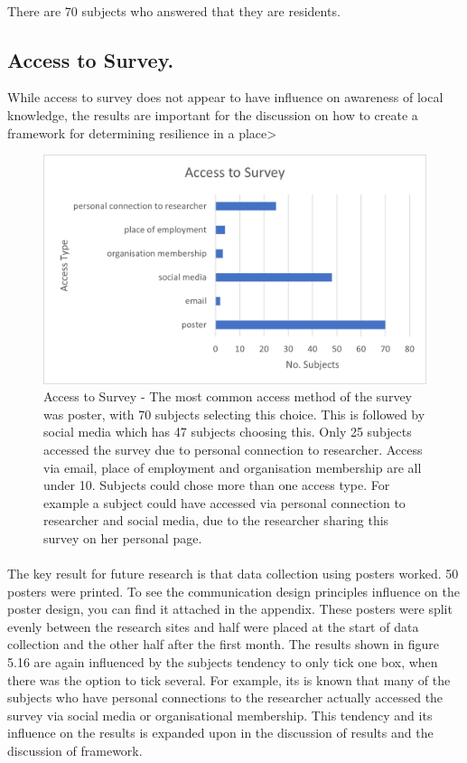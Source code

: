 \paragraph{}

There are 70 subjects who answered that they are residents.


\subsection{Access to Survey. }
While access to survey does not appear to have influence on awareness of local knowledge, the results are important for the discussion on how to create a framework for determining resilience in a place>

\begin{figure}[h!]
    \centering
    \includegraphics{fig_results/access_survey.png}
    \caption{Access to Survey - The most common access method of the survey was poster, with 70 subjects selecting this choice. This is followed by social media which has 47 subjects choosing this. Only 25 subjects accessed the survey due to personal connection to researcher. Access via email, place of employment and organisation membership are all under 10. Subjects could chose more than one access type. For example a subject could have accessed via personal connection to researcher and social media, due to the researcher sharing this survey on her personal page. }
    \label{fig:my_label}
\end{figure}
\paragraph{}

The key result for future research is that data collection using posters worked. 50 posters were printed. To see the communication design principles influence on the poster design, you can find it attached in the appendix. These posters were split evenly between the research sites and half were placed at the start of data collection and the other half after the first month. The results shown in figure 5.16 are again influenced by the subjects tendency to only tick one box, when there was the option to tick several. For example, its is known that many of the subjects who have personal connections to the researcher actually accessed the survey via social media or organisational membership. This tendency and its influence on the results is expanded upon in the discussion of results and the discussion of framework. 
